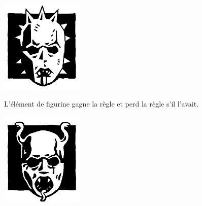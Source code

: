\newcommand{\logosize}{4cm}
\begin{multicols}{2}\raggedcolumns
\begin{center}
\includegraphics[width=\logosize]{pics/cultofnabh.png}
\armyspecialruleentry{\cultofnabh}

L'élément de figurine gagne la règle \hatred{} et perd la règle \killerinstinct{} s'il l'avait.
\end{center}

\begin{center}
\includegraphics[width=\logosize]{pics/cultofyema.png}
\armyspecialruleentry{\cultofyema}


\end{center}
\end{multicols}
